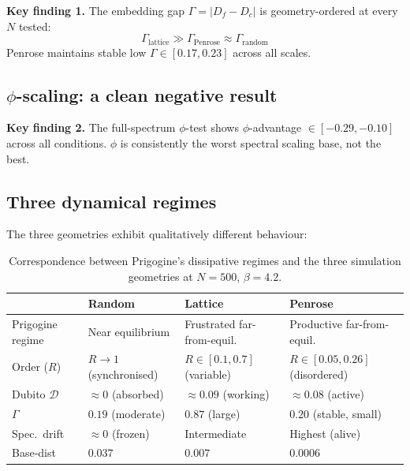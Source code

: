 \documentclass[12pt,a4paper]{article}
\theoremstyle{plain}
\theoremstyle{definition}
\begin{document}
\begin{keyresult}
\textbf{Key finding 1.} The embedding gap $\Gamma = |D_f - D_c|$ is
geometry-ordered at every $N$ tested:
\[
\Gamma_{\text{lattice}} \gg \Gamma_{\text{Penrose}} \approx \Gamma_{\text{random}}
\]
Penrose maintains stable low $\Gamma \in [0.17, 0.23]$ across all scales.
\end{keyresult}

\subsection{$\phi$-scaling: a clean negative result}

\begin{keyresult}
\textbf{Key finding 2.} The full-spectrum $\phi$-test shows
$\phi$-advantage $\in [-0.29, -0.10]$ across all conditions.
$\phi$ is consistently the worst spectral scaling base, not the best.
\end{keyresult}

\subsection{Three dynamical regimes}

The three geometries exhibit qualitatively different behaviour:

\begin{table}[H]
\centering
\caption{Correspondence between Prigogine's dissipative regimes and the
  three simulation geometries at $N = 500$, $\beta = 4.2$.}
\label{tab:prigogine}
\begin{tabular}{p{2.5cm}p{3.5cm}p{3.5cm}p{3.5cm}}
\toprule
 & \textbf{Random} & \textbf{Lattice} & \textbf{Penrose} \\
\midrule
Prigogine regime &
  Near equilibrium &
  Frustrated far-from-equil. &
  Productive far-from-equil. \\[4pt]
Order ($R$) &
  $R \to 1$ (synchronised) &
  $R \in [0.1, 0.7]$ (variable) &
  $R \in [0.05, 0.26]$ (disordered) \\[4pt]
Dubito $\mathcal{D}$ &
  $\approx 0$ (absorbed) &
  $\approx 0.09$ (working) &
  $\approx 0.08$ (active) \\[4pt]
$\Gamma$ &
  $0.19$ (moderate) &
  $0.87$ (large) &
  $0.20$ (stable, small) \\[4pt]
Spec.\ drift &
  $\approx 0$ (frozen) &
  Intermediate &
  Highest (alive) \\[4pt]
Base-dist &
  $0.037$ &
  $0.007$ &
  $\mathbf{0.0006}$ \\
\bottomrule
\end{tabular}
\end{table}
\end{document}

